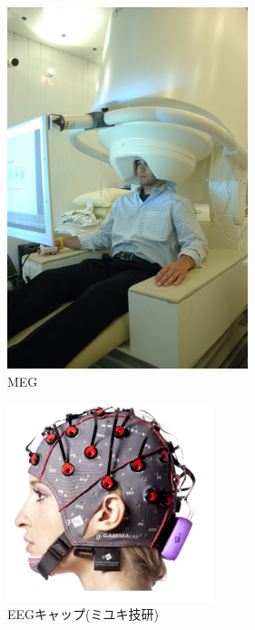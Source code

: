 \begin{figure}
    \begin{center}
    \includegraphics[width=70mm]{images/MEG.jpg}
    \end{center}
    \caption{MEG}
    \label{fig:MEG}
\end{figure}

\begin{figure}
    \begin{center}
    \includegraphics[width=60mm]{images/eeg.png}
    \end{center}
    \caption{EEGキャップ(ミユキ技研)}
    \label{fig:EEG}
\end{figure}

